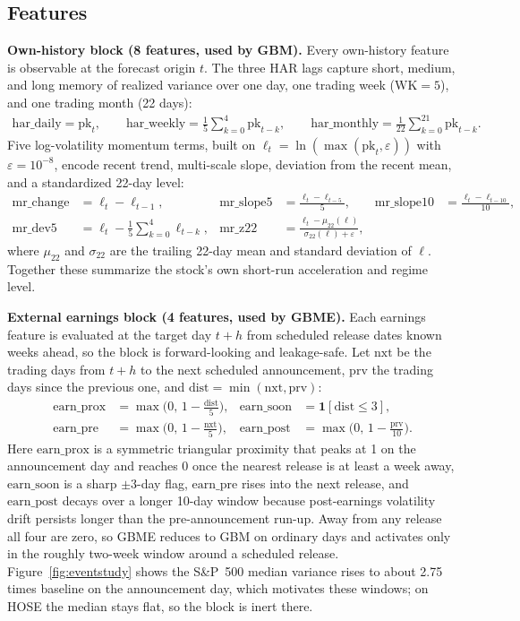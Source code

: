 \documentclass{llncs}
\begin{document}
\subsection*{Features}
\textbf{Own-history block (8 features, used by GBM).} Every own-history feature is observable at the
forecast origin $t$. The three HAR lags capture short, medium, and long memory of realized variance
over one day, one trading week ($\mathrm{WK}=5$), and one trading month (22 days):
\begin{align}
\mathrm{har\_daily} = \mathrm{pk}_t, \qquad
\mathrm{har\_weekly} = \frac{1}{5}\sum_{k=0}^{4}\mathrm{pk}_{t-k}, \qquad
\mathrm{har\_monthly} = \frac{1}{22}\sum_{k=0}^{21}\mathrm{pk}_{t-k}.
\end{align}
Five log-volatility momentum terms, built on $\ell_t=\ln(\max(\mathrm{pk}_t,\varepsilon))$ with
$\varepsilon=10^{-8}$, encode recent trend, multi-scale slope, deviation from the recent mean, and a
standardized 22-day level:
\begin{align}
\mathrm{mr\_change} &= \ell_t-\ell_{t-1}, &
\mathrm{mr\_slope5} &= \frac{\ell_t-\ell_{t-5}}{5}, &
\mathrm{mr\_slope10} &= \frac{\ell_t-\ell_{t-10}}{10},\\
\mathrm{mr\_dev5} &= \ell_t-\frac{1}{5}\sum_{k=0}^{4}\ell_{t-k}, &
\mathrm{mr\_z22} &= \frac{\ell_t-\mu_{22}(\ell)}{\sigma_{22}(\ell)+\varepsilon}, &&
\end{align}
where $\mu_{22}$ and $\sigma_{22}$ are the trailing 22-day mean and standard deviation of $\ell$.
Together these summarize the stock's own short-run acceleration and regime level.

\textbf{External earnings block (4 features, used by GBME).} Each earnings feature is evaluated at the
target day $t+h$ from scheduled release dates known weeks ahead, so the block is forward-looking and
leakage-safe. Let $\mathrm{nxt}$ be the trading days from $t+h$ to the next scheduled announcement,
$\mathrm{prv}$ the trading days since the previous one, and $\mathrm{dist}=\min(\mathrm{nxt},\mathrm{prv})$:
\begin{align}
\mathrm{earn\_prox} &= \max\!\Big(0,\,1-\tfrac{\mathrm{dist}}{5}\Big), &
\mathrm{earn\_soon} &= \mathbf{1}[\mathrm{dist}\le 3],\\
\mathrm{earn\_pre} &= \max\!\Big(0,\,1-\tfrac{\mathrm{nxt}}{5}\Big), &
\mathrm{earn\_post} &= \max\!\Big(0,\,1-\tfrac{\mathrm{prv}}{10}\Big).
\end{align}
Here $\mathrm{earn\_prox}$ is a symmetric triangular proximity that peaks at 1 on the announcement day
and reaches 0 once the nearest release is at least a week away, $\mathrm{earn\_soon}$ is a sharp
$\pm 3$-day flag, $\mathrm{earn\_pre}$ rises into the next release, and $\mathrm{earn\_post}$ decays
over a longer 10-day window because post-earnings volatility drift persists longer than the
pre-announcement run-up. Away from any release all four are zero, so GBME reduces to GBM on ordinary
days and activates only in the roughly two-week window around a scheduled release.
Figure~\ref{fig:eventstudy} shows the S\&P~500 median variance rises to about 2.75 times baseline on
the announcement day, which motivates these windows; on HOSE the median stays flat, so the block is
inert there.
\end{document}
